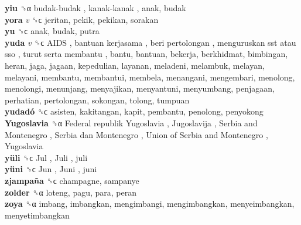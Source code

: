 \textbf{yiu} ␝α   budak-budak ,  kanak-kanak , anak, budak  \\
\textbf{yora} \emph{v}  ␝ϲ  jeritan, pekik, pekikan, sorakan  \\
\textbf{yu} ␝ϲ  anak, budak, putra  \\
\textbf{yuda} \emph{v}  ␝ϲ   AIDS ,  bantuan kerjasama ,  beri pertolongan ,  menguruskan sst atau sso ,  turut serta membantu , bantu, bantuan, bekerja, berkhidmat, bimbingan, heran, jaga, jagaan, kepedulian, layanan, meladeni, melambuk, melayan, melayani, membantu, membantui, membela, menangani, mengembari, menolong, menolongi, menunjang, menyajikan, menyantuni, menyumbang, penjagaan, perhatian, pertolongan, sokongan, tolong, tumpuan  \\
\textbf{yudadó} ␝ϲ  asisten, kakitangan, kapit, pembantu, penolong, penyokong  \\
\textbf{Yugoslavia} ␝α   Federal republik Yugoslavia ,  Jugoslavija ,  Serbia and Montenegro ,  Serbia dan Montenegro ,  Union of Serbia and Montenegro ,  Yugoslavia   \\
\textbf{yüli} ␝ϲ   Jul ,  Juli , juli  \\
\textbf{yüni} ␝ϲ   Jun ,  Juni , juni  \\
\textbf{zjampaña} ␝ϲ  champagne, sampanye  \\
\textbf{zolder} ␝α  loteng, pagu, para, peran  \\
\textbf{zoya} ␝α  imbang, imbangkan, mengimbangi, mengimbangkan, menyeimbangkan, menyetimbangkan  \\
